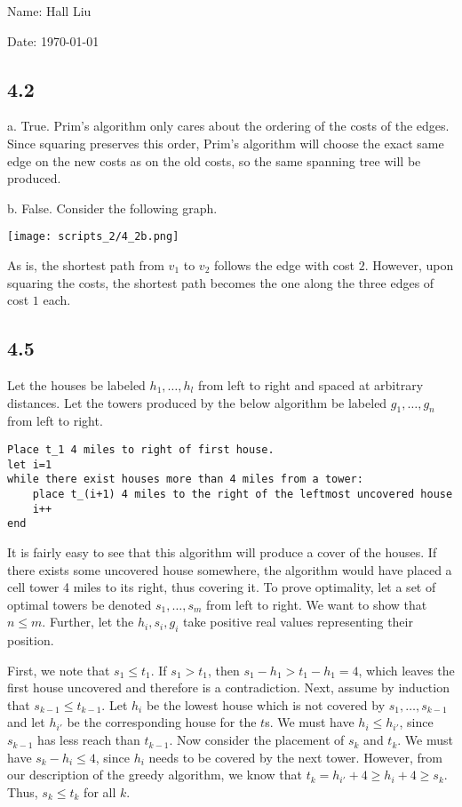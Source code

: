 \documentclass{article}
\begin{document}
Name: Hall Liu

Date: \today 
\vspace{1.5cm}
\subsection*{4.2}
a. True. Prim's algorithm only cares about the ordering of the costs of the edges. Since squaring preserves this order, Prim's algorithm will choose the exact same edge on the new costs as on the old costs, so the same spanning tree will be produced.

b. False. Consider the following graph.

\texttt{[image: scripts\_2/4\_2b.png]}

As is, the shortest path from $v_1$ to $v_2$ follows the edge with cost $2$. However, upon squaring the costs, the shortest path becomes the one along the three edges of cost $1$ each.
\subsection*{4.5}
Let the houses be labeled $h_1,\ldots,h_l$ from left to right and spaced at arbitrary distances. Let the towers produced by the below algorithm be labeled $g_1,\ldots,g_n$ from left to right.
\begin{verbatim}
Place t_1 4 miles to right of first house.
let i=1
while there exist houses more than 4 miles from a tower:
    place t_(i+1) 4 miles to the right of the leftmost uncovered house
    i++
end
\end{verbatim}
It is fairly easy to see that this algorithm will produce a cover of the houses. If there exists some uncovered house somewhere, the algorithm would have placed a cell tower 4 miles to its right, thus covering it. To prove optimality, let a set of optimal towers be denoted $s_1,\ldots,s_m$ from left to right. We want to show that $n\leq m$. Further, let the $h_i,s_i,g_i$ take positive real values representing their position.

First, we note that $s_1\leq t_1$. If $s_1>t_1$, then $s_1-h_1>t_1-h_1=4$, which leaves the first house uncovered and therefore is a contradiction. Next, assume by induction that $s_{k-1}\leq t_{k-1}$. Let $h_i$ be the lowest house which is not covered by $s_1,\ldots,s_{k-1}$ and let $h_{i'}$ be the corresponding house for the $t$s. We must have $h_i\leq h_{i'}$, since $s_{k-1}$ has less reach than $t_{k-1}$. Now consider the placement of $s_k$ and $t_k$. We must have $s_k-h_i\leq 4$, since $h_i$ needs to be covered by the next tower. However, from our description of the greedy algorithm, we know that $t_k=h_{i'}+4\geq h_i+4\geq s_k$. Thus, $s_k\leq t_k$ for all $k$.
\end{document}
